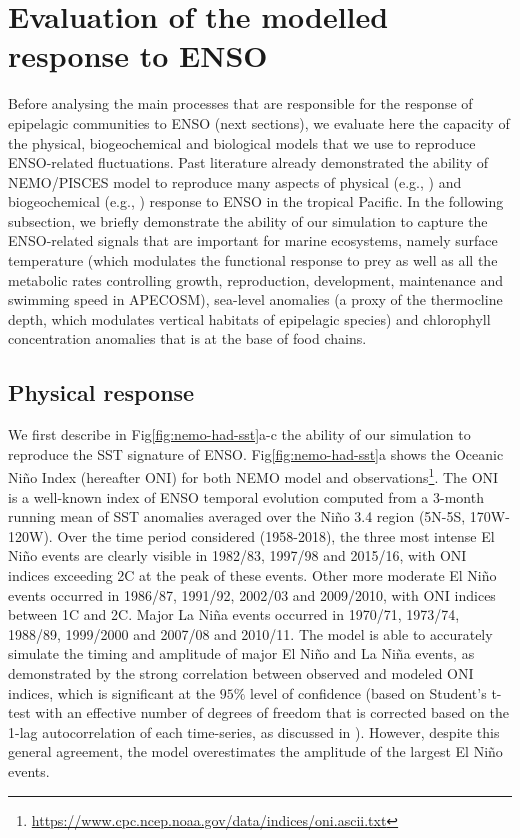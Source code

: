 \section{Evaluation of the modelled response to ENSO}
\label{sec:model-val}

Before analysing the main processes that are responsible for the response of epipelagic communities to ENSO (next sections), we evaluate here the capacity of the physical, biogeochemical and biological models that we use to reproduce ENSO-related fluctuations. Past literature already demonstrated the ability of NEMO/PISCES model to reproduce many aspects of physical (e.g., \citealt{vialardModelStudyOceanic2001, lengaigneOceanResponseMarch2002}) and biogeochemical (e.g., \citealt{ masottiLargescaleShiftsPhytoplankton2011}) response to ENSO in the tropical Pacific. In the following subsection, we briefly demonstrate the ability of our simulation to capture the ENSO-related signals that are important for marine ecosystems, namely surface temperature (which modulates the functional response to prey as well as all the metabolic rates controlling growth, reproduction, development, maintenance and swimming speed in APECOSM), sea-level anomalies (a proxy of the thermocline depth, which modulates vertical habitats of epipelagic species) and chlorophyll concentration anomalies that is at the base of food chains.

\subsection{Physical response}

We first describe in Fig\ref{fig:nemo-had-sst}a-c the ability of our simulation to reproduce the SST signature of ENSO. Fig\ref{fig:nemo-had-sst}a shows the Oceanic Niño Index (hereafter ONI) for both NEMO model and observations\footnote{\url{https://www.cpc.ncep.noaa.gov/data/indices/oni.ascii.txt}}. The ONI is a well-known index of ENSO temporal evolution computed from a 3-month running mean of SST anomalies averaged over the Niño 3.4 region (5N-5S, 170W-120W). Over the time period considered (1958-2018), the three most intense El Niño events are clearly visible in 1982/83, 1997/98 and 2015/16, with ONI indices exceeding 2\degree{}C at the peak of these events. Other more moderate El Niño events occurred in 1986/87, 1991/92, 2002/03 and 2009/2010, with ONI indices between 1\degree{}C and 2\degree{}C. Major La Niña events occurred in 1970/71, 1973/74, 1988/89, 1999/2000 and 2007/08 and 2010/11. The model is able to accurately simulate the timing and amplitude of major El Niño and La Niña events, as demonstrated by the strong correlation between observed and modeled ONI indices, which is significant at the $95\%$ level of confidence (based on Student's t-test with an effective number of degrees of freedom that is corrected based on the 1-lag autocorrelation of each time-series, as discussed in \cite{brethertonEffectiveNumberSpatial1999}). However, despite this general agreement, the model overestimates the amplitude of the largest El Niño events. 

